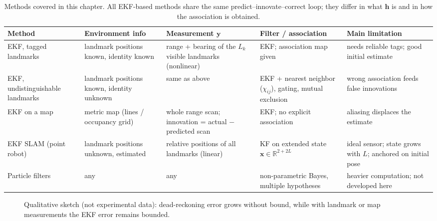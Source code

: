 \documentclass[11pt,a4paper]{article}
\theoremstyle{definition}
\theoremstyle{plain}
\theoremstyle{remark}
\newcommand{\R}{\mathbb{R}}
\begin{document}
\begin{table}[ht]
\centering
\small
\renewcommand{\arraystretch}{1.25}
\begin{tabularx}{\linewidth}{@{}>{\raggedright\arraybackslash}p{2.4cm}YYYY@{}}
\toprule
\textbf{Method} & \textbf{Environment info} & \textbf{Measurement $\bm y$} & \textbf{Filter / association} & \textbf{Main limitation}\\
\midrule
EKF, tagged landmarks & landmark positions known, identity known & range + bearing of the $L_k$ visible landmarks (nonlinear) & EKF; association map given & needs reliable tags; good initial estimate\\
EKF, undistinguishable landmarks & landmark positions known, identity unknown & same as above & EKF + nearest neighbor ($\chi_{ij}$), gating, mutual exclusion & wrong association feeds false innovations\\
EKF on a map & metric map (lines / occupancy grid) & whole range scan; innovation = actual $-$ predicted scan & EKF; no explicit association & aliasing displaces the estimate\\
EKF SLAM (point robot) & landmark positions unknown, estimated & relative positions of all landmarks (linear) & KF on extended state $\bm x\in\R^{2+2L}$ & ideal sensor; state grows with $L$; anchored on initial pose\\
Particle filters & any & any & non-parametric Bayes, multiple hypotheses & heavier computation; not developed here\\
\bottomrule
\end{tabularx}
\caption{Methods covered in this chapter. All EKF-based methods share the same predict--innovate--correct loop; they differ in what $\bm h$ is and in how the association is obtained.}
\end{table}

\begin{figure}[H]
\centering
{}
\caption{Qualitative sketch (not experimental data): dead-reckoning error grows without bound, while with landmark or map measurements the EKF error remains bounded.}
\label{fig:errors}
\end{figure}
\end{document}
